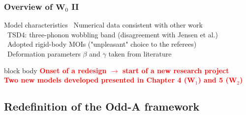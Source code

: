 \documentclass{beamer}
\begin{document}
\begin{frame}
	\frametitle{Overview of $\mathbf{W}_0$ II}
	\begin{block}{Model characteristics}
		\faPlus\ Numerical data consistent with other work\\
		\faMinus\ TSD4: three-phonon wobbling band (disagreement with Jensen et al.)\\
		\faMinus\ Adopted rigid-body MOIs ("unpleasant" choice to the referees) \\
		\faMinus\ Deformation parameters $\beta$ and $\gamma$ taken from literature
	\end{block}
	\begin{beamercolorbox}[rounded=true,shadow=false, wd=\linewidth,]{block body}
		\centering
		\textcolor{red}{\small{\textbf{Onset of a redesign $\longrightarrow$ start of a new research project}}}\\
		\textcolor{red}{\small{\textbf{Two new models developed presented in Chapter 4 ($\mathbf{W}_1$) and 5 ($\mathbf{W}_2$)}}}\\
	\end{beamercolorbox}
\end{frame}
\subsection{Redefinition of the Odd-A framework}
\end{document}

